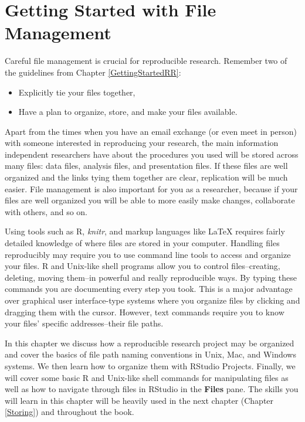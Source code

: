 



\chapter{Getting Started with File Management}\label{DirectoriesChapter}

Careful file management is crucial for reproducible research. Remember two of the guidelines from Chapter \ref{GettingStartedRR}:

\begin{itemize}
    \item Explicitly tie your files together,
    \item Have a plan to organize, store, and make your files available. 
\end{itemize}

Apart from the times when you have an email exchange (or even meet in person) with someone interested in reproducing your research, the main information independent researchers have about the procedures you used will be stored across many files: data files, analysis files, and presentation files. If these files are well organized and the links tying them together are clear, replication will be much easier. File management is also important for you as a researcher, because if your files are well organized you will be able to more easily make changes, collaborate with others, and so on. 

Using tools such as R, {\emph{knitr}}, and markup languages like LaTeX requires fairly detailed knowledge of where files are stored in your computer. Handling files reproducibly may require you to use command line tools to access and organize your files. R and Unix-like shell programs allow you to control files--creating, deleting, moving them--in powerful and really reproducible ways. By typing these commands you are documenting every step you took. This is a major advantage over graphical user interface-type systems where you organize files by clicking and dragging them with the cursor. However, text commands require you to know your files' specific addresses--their file paths. 

In this chapter we discuss how a reproducible research project may be organized and cover the basics of file path naming conventions in Unix, Mac, and Windows systems. We then learn how to organize them with RStudio Projects. Finally, we will cover some basic R and Unix-like shell commands for manipulating files as well as how to navigate through files in RStudio in the {\bf{Files}} pane. The skills you will learn in this chapter will be heavily used in the next chapter (Chapter \ref{Storing}) and throughout the book.

